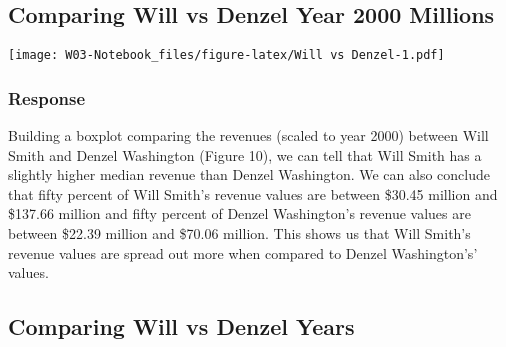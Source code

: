 \documentclass[
]{article}
\newenvironment{Shaded}{\begin{snugshade}}{\end{snugshade}}
\newcommand{\DataTypeTok}[1]{\textcolor[rgb]{0.13,0.29,0.53}{#1}}
\newcommand{\FloatTok}[1]{\textcolor[rgb]{0.00,0.00,0.81}{#1}}
\newcommand{\KeywordTok}[1]{\textcolor[rgb]{0.13,0.29,0.53}{\textbf{#1}}}
\newcommand{\NormalTok}[1]{#1}
\newcommand{\OperatorTok}[1]{\textcolor[rgb]{0.81,0.36,0.00}{\textbf{#1}}}
\newcommand{\StringTok}[1]{\textcolor[rgb]{0.31,0.60,0.02}{#1}}
\begin{document}
\begin{Shaded}
\begin{Highlighting}[]
\hypertarget{comparing-will-vs-denzel-year-2000-millions}{%
\subsection{Comparing Will vs Denzel Year 2000
Millions}\label{comparing-will-vs-denzel-year-2000-millions}}

\begin{Shaded}
\end{Shaded}

\texttt{[image: W03-Notebook\_files/figure-latex/Will vs Denzel-1.pdf]}

\hypertarget{response-3}{%
\subsubsection{Response}\label{response-3}}

Building a boxplot comparing the revenues (scaled to year 2000) between
Will Smith and Denzel Washington (Figure 10), we can tell that Will
Smith has a slightly higher median revenue than Denzel Washington. We
can also conclude that fifty percent of Will Smith's revenue values are
between \$30.45 million and \$137.66 million and fifty percent of Denzel
Washington's revenue values are between \$22.39 million and \$70.06
million. This shows us that Will Smith's revenue values are spread out
more when compared to Denzel Washington's' values.

\hypertarget{comparing-will-vs-denzel-years}{%
\subsection{Comparing Will vs Denzel
Years}\label{comparing-will-vs-denzel-years}}

\begin{Shaded}
\end{Shaded}


\end{Highlighting}
\end{Shaded}
\end{document}
